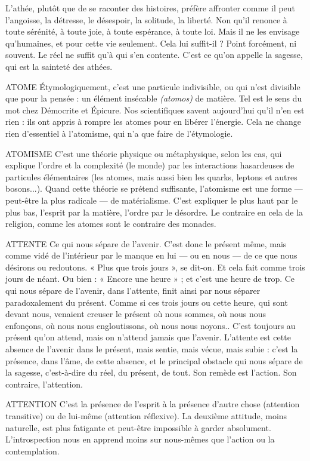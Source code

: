L’athée, plutôt que de se raconter des histoires, préfère affronter comme il
peut l’angoisse, la détresse, le désespoir, la solitude, la liberté. Non qu'il
renonce à toute sérénité, à toute joie, à toute espérance, à toute loi. Mais il ne
les envisage qu’humaines, et pour cette vie seulement. Cela lui suffit-il ? Point
forcément, ni souvent. Le réel ne suffit qu’à qui s’en contente. C’est ce qu’on
appelle la sagesse, qui est la sainteté des athées.

ATOME  Étymologiquement, c’est une particule indivisible, ou qui n’est divisible
que pour la pensée : un élément insécable {\it (atomos)} de matière.
Tel est le sens du mot chez Démocrite et Épicure. Nos scientifiques savent
aujourd’hui qu’il n’en est rien : ils ont appris à rompre les atomes pour en
libérer l'énergie. Cela ne change rien d’essentiel à l’atomisme, qui n’a que faire
de l’étymologie.

ATOMISME C'est une théorie physique ou métaphysique, selon les cas, qui
explique l’ordre et la complexité (le monde) par les interactions
hasardeuses de particules élémentaires (les atomes, mais aussi bien les quarks, leptons
et autres bosons...). Quand cette théorie se prétend suffisante, l’atomisme
est une forme — peut-être la plus radicale — de matérialisme. C’est expliquer le
plus haut par le plus bas, l'esprit par la matière, l’ordre par le désordre. Le
contraire en cela de la religion, comme les atomes sont le contraire des monades.

ATTENTE Ce qui nous sépare de l’avenir. C’est donc le présent même, mais
comme vidé de l’intérieur par le manque en lui — ou en nous —
de ce que nous désirons ou redoutons. « Plus que trois jours », se dit-on. Et cela
fait comme trois jours de néant. Ou bien : « Encore une heure » ; et c’est une
heure de trop. Ce qui nous sépare de l’avenir, dans l'attente, finit ainsi par nous
séparer paradoxalement du présent. Comme si ces trois jours ou cette heure,
qui sont devant nous, venaient creuser le présent où nous sommes, où nous
nous enfonçons, où nous nous engloutissons, où nous nous noyons.. C’est
toujours au présent qu’on attend, mais on n'attend jamais que l'avenir.
L’attente est cette absence de l’avenir dans le présent, mais sentie, mais vécue,
mais subie : c’est la présence, dans l’âme, de cette absence, et le principal obstacle
qui nous sépare de la sagesse, c’est-à-dire du réel, du présent, de tout.
Son remède est l’action. Son contraire, l'attention.

ATTENTION C'est la présence de l'esprit à la présence d’autre chose (attention
transitive) ou de lui-même (attention réflexive). La
deuxième attitude, moins naturelle, est plus fatigante et peut-être impossible à
garder absolument. L’introspection nous en apprend moins sur nous-mêmes
que l’action ou la contemplation.


